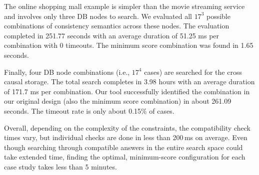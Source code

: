 The online shopping mall example is simpler than the movie streaming service
and involves only three DB nodes to search.
We evaluated all $17^3$ possible combinations of consistency semantics across
these nodes. The evaluation completed in 251.77 seconds with an average
duration of 51.25 ms per combination with 0 timeouts. The minimum score combination 
was found in 1.65 seconds. 

Finally, four DB node combinations (i.e., $17^4$ cases) are searched for
the cross causal storage. The total search completes in 3.98 hours
with an average duration of 171.7 ms per combination.
Our tool successfully identified the combination in our original design (also the
minimum score combination) in about 261.09 seconds. The timeout rate is only about 0.15\% of cases.

Overall, depending on the complexity of the constraints, the
compatibility check times
vary, but individual checks are done in less than 200\,ms on average. Even though
searching through compatible answers in the entire search space could
take extended
time, finding the optimal, minimum-score configuration for each case
study takes less than 5 minutes.


